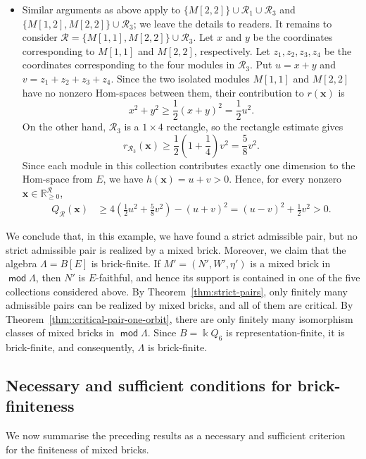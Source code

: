 \documentclass[a4,12pt]{amsart}
\numberwithin{equation}{section} %
\def\mod{\operatorname{\mathsf{mod}}}
\theoremstyle{definition} %
\begin{document}
\begin{itemize}
\item Similar arguments as above apply to $\{M[2,2]\}\cup\mathcal{R}_1\cup\mathcal{R}_3$ and $\{M[1,2],M[2,2]\}\cup\mathcal{R}_3$; we leave the details to readers. It remains to consider $\mathcal{R}=\{M[1,1],M[2,2]\}\cup\mathcal{R}_3$. Let $x$ and $y$ be the coordinates corresponding to $M[1,1]$ and $M[2,2]$, respectively. 
Let $z_1,z_2,z_3,z_4$ be the coordinates corresponding to the four modules in $\mathcal{R}_3$. Put $u=x+y$ and $v=z_1+z_2+z_3+z_4$. Since the two isolated modules $M[1,1]$ and $M[2,2]$ have no nonzero Hom-spaces between them, their contribution to $r(\mathbf{x})$ is
\[
x^2+y^2\geq\frac12(x+y)^2=\frac12u^2.
\]
On the other hand, $\mathcal{R}_3$ is a $1\times4$ rectangle, so the rectangle estimate gives
\[
r_{\mathcal{R}_3}(\mathbf{x})
\geq
\frac12\left(1+\frac14\right)v^2
=
\frac58v^2.
\]
Since each module in this collection contributes exactly one dimension to the Hom-space from $E$, we have $h(\mathbf{x})=u+v>0$. Hence, for every nonzero $\mathbf{x}\in\mathbb{R}_{\geq 0}^{\mathcal{R}}$,
\[
\begin{aligned}
Q_{\mathcal{R}}(\mathbf{x})
&\geq
4\left(\frac12u^2+\frac58v^2\right)-(u+v)^2=(u-v)^2+\frac12v^2
>0.
\end{aligned}
\]
\end{itemize}

We conclude that, in this example, we have found a strict admissible pair, but no strict admissible pair is realized by a mixed brick. Moreover, we claim that the algebra $\Lambda=B[E]$ is brick-finite. If $M'=(N',W',\eta')$ is a mixed brick in $\mod \Lambda$, then $N'$ is $E$-faithful, and hence its support is contained in one of the five collections considered above. By Theorem~\ref{thm:strict-pairs}, only finitely many admissible pairs can be realized by mixed bricks, and all of them are critical. By Theorem~\ref{thm::critical-pair-one-orbit}, there are only finitely many isomorphism classes of mixed bricks in $\mod \Lambda$. Since $B=\Bbbk Q_6$ is representation-finite, it is brick-finite, and consequently, $\Lambda$ is brick-finite.

\subsection{Necessary and sufficient conditions for brick-finiteness}
We now summarise the preceding results as a necessary and sufficient criterion for the finiteness of mixed bricks. 
\end{document}
